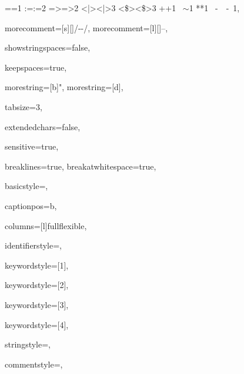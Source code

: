 {{=}{{\color{symbolcolor}=}}1
{:=}{{\color{symbolcolor}:=}}2
{=>}{{\color{symbolcolor}=>}}2
{<|>}{{\color{symbolcolor}<|>}}3
{<\$>}{{\color{symbolcolor}<\$>}}3
{+}{{\color{symbolcolor}+}}1
{~}{{\color{symbolcolor}\ensuremath{\sim}}}1
{*}{{\color{symbolcolor}*}}1
{\ -\ }{{\color{symbolcolor}\ -\ }}1,

morecomment=[s][\color{commentcolor}]{/-}{-/},
morecomment=[l][\color{commentcolor}]{--},

showstringspaces=false,

keepspaces=true,

morestring=[b]",
morestring=[d],

tabsize=3,

extendedchars=false,

sensitive=true,

breaklines=true,
breakatwhitespace=true,

basicstyle=\ttfamily\small,

captionpos=b,

columns=[l]fullflexible,

identifierstyle={\ttfamily\color{black}},

keywordstyle=[1]{\ttfamily\color{keywordcolor}},

keywordstyle=[2]{\ttfamily\color{sortcolor}},

keywordstyle=[3]{\ttfamily\color{tacticcolor}},

keywordstyle=[4]{\ttfamily\color{attributecolor}},

stringstyle=\ttfamily,

commentstyle={\ttfamily\upshape\footnotesize\color{gray}},

}
